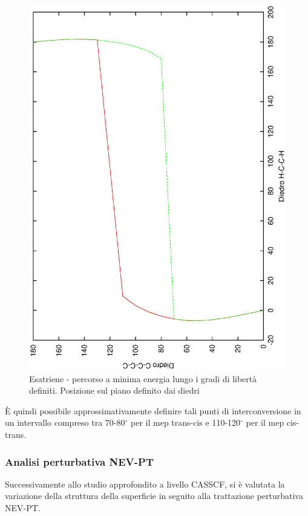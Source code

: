 \begin{figure}[ht]
\begin{center}
\includegraphics[angle=270,width=12cm,keepaspectratio]{immagini/esatriene/punti_minimo.eps}
\caption{\small Esatriene - percorso a minima energia lungo i gradi di
libert\`a definiti. Posizione sul piano definito dai diedri}
\label{fig:esatriene_punti_minimo}
\end{center}
\end{figure}

\`E quindi possibile approssimativamente definire tali punti di
interconversione in un intervallo compreso tra 70-80$^{\circ}$ per il mep
trans-cis e 110-120$^{\circ}$ per il mep cis-trans.

\subsubsection{Analisi perturbativa NEV-PT}

Successivamente allo studio approfondito a livello CASSCF, si \`e valutata
la variazione della struttura della superficie in seguito alla trattazione
perturbativa NEV-PT.

